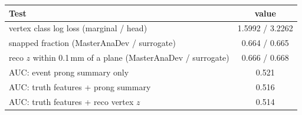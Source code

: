 \begin{tabular}{lc}
\toprule
Test & value \\
\midrule
vertex class log loss (marginal / head) & 1.5992 / 3.2262 \\
snapped fraction (MasterAnaDev / surrogate) & 0.664 / 0.665 \\
reco $z$ within 0.1\,mm of a plane (MasterAnaDev / surrogate) & 0.666 / 0.668 \\
\midrule
AUC: event prong summary only & 0.521 \\
AUC: truth features + prong summary & 0.516 \\
AUC: truth features + reco vertex $z$ & 0.514 \\
\bottomrule
\end{tabular}
